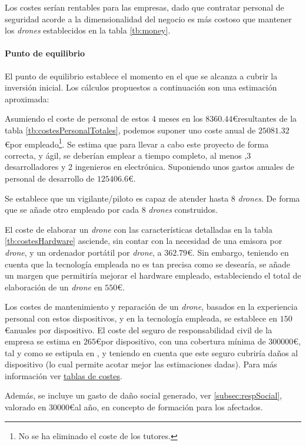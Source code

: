 Los costes serían rentables para las empresas, dado que contratar personal de seguridad acorde a la dimensionalidad del negocio es más costoso que mantener los \emph{drones} establecidos en la tabla \ref{tb:money}.

\paragraph{Punto de equilibrio} El punto de equilibrio establece el momento en el que se alcanza a cubrir la inversión inicial. Los cálculos propuestos a continuación son una estimación aproximada: 

Asumiendo el coste de personal de estos 4 meses en los $8360.44$\euro resultantes de la tabla \ref{tb:costesPersonalTotales}, podemos suponer uno coste anual de $25081.32$\euro por empleado\footnote{No se ha eliminado el coste de los tutores.}. 
Se estima que para llevar a cabo este proyecto de forma correcta, y ágil, se deberían emplear a tiempo completo, al menos ,3 desarrolladores y 2 ingenieros en electrónica. Suponiendo unos gastos anuales de personal de desarrollo de $125406.6$\euro.

Se establece que un vigilante/piloto es capaz de atender hasta 8 \emph{drones}. De forma que se añade otro empleado por cada 8 \emph{drones} construidos.

El coste de elaborar un \emph{drone} con las características detalladas en la tabla \ref{tb:costesHardware} asciende, sin contar con la necesidad de una emisora por \emph{drone}, y un ordenador portátil por \emph{drone}, a $362.79$\euro. Sin embargo, teniendo en cuenta que la tecnología empleada no es tan precisa como se desearía, se añade un margen que permitiría mejorar el hardware empleado, estableciendo el total de elaboración de un \emph{drone} en $550$\euro. 

Los costes de mantenimiento y reparación de un \emph{drone}, basados en la experiencia personal con estos dispositivos, y en la tecnología empleada, se establece en $150$\euro anuales por dispositivo. El coste del seguro de responsabilidad civil de la empresa se estima en $265$\euro por dispositivo, con una cobertura mínima de $300000$\euro, tal y como se estipula en \citep{wiki:respCivil}, y teniendo en cuenta que este seguro cubriría daños al dispositivo (lo cual permite acotar mejor las estimaciones dadas). Para más información ver \href{https://www.aenus.es/responsabilidad-civil-danos-profesional/}{tablas de costes}. 

Además, se incluye un gasto de daño social generado, ver \ref{subsec:respSocial}, valorado en $30000$\euro al año, en concepto de formación para los afectados.

